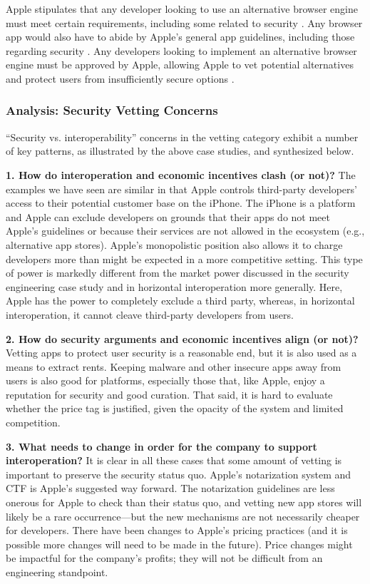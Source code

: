 \documentclass[letterpaper,twocolumn,10pt]{article}
\newcommand{\qone}{How do interoperation and economic incentives clash
(or not)?\xspace}
\newcommand{\qtwo}{How do security arguments and economic incentives align (or not)?\xspace}
\newcommand{\qthree}{What needs to change in order for the company to support interoperation?\xspace}
\newcommand{\question}[1]{\smallskip \noindent \textbf{{#1}}}
\begin{document}
Apple stipulates that any developer looking to use an alternative browser engine must meet certain requirements, including some related to security \cite{apple_alt_webkit}.  Any browser app would also have to abide by Apple's general app guidelines, including those regarding security \cite{apple_app_review}.  
Any developers looking to implement an alternative browser engine must be approved by Apple, allowing Apple to vet potential alternatives and protect users from insufficiently secure options \cite{apple_alt_webkit}.

\subsubsection{Analysis: Security Vetting Concerns}
``Security vs. interoperability'' concerns in the vetting category exhibit a number of key patterns, as illustrated by the above case studies, and synthesized below.

\question{1. \qone}
The examples we have seen are similar in that Apple controls third-party developers' access to their potential customer base on the iPhone. The iPhone is a platform and Apple can exclude developers on grounds that their apps do not meet Apple's guidelines or because their services are not allowed in the ecosystem (e.g., alternative app stores). Apple's monopolistic position also allows it to charge developers more than might be expected in a more competitive setting. This type of power is markedly different from the market power discussed in the security engineering case study and in horizontal interoperation more generally. Here, Apple has the power to completely exclude a third party, whereas, in horizontal interoperation, it cannot cleave third-party developers from users.  

\question{2. \qtwo} 
Vetting apps to protect user security is a reasonable end, but it is also used as a means to extract rents. Keeping malware and other insecure apps away from users is also good for platforms, especially those that, like Apple, enjoy a reputation for security and good curation.  That said, it is hard to evaluate whether the price tag is justified, given the opacity of the system and limited competition. 

\question{3. \qthree}
It is clear in all these cases that some amount of vetting is important to preserve the security status quo. Apple's notarization system and CTF is Apple's suggested way forward. The notarization guidelines are less onerous for Apple to check than their status quo, and vetting new app stores will likely be a rare occurrence---but the new mechanisms are not necessarily cheaper for developers. There have been changes to Apple's pricing practices (and it is possible more changes will need to be made in the future).  Price changes might be impactful for the company's profits; they will not be difficult from an engineering standpoint. 
\end{document}
